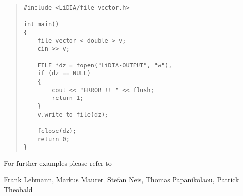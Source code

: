 
\EXAMPLES

\begin{quote}
\begin{verbatim}
#include <LiDIA/file_vector.h>

int main()
{
    file_vector < double > v;
    cin >> v;

    FILE *dz = fopen("LiDIA-OUTPUT", "w");
    if (dz == NULL)
    {
        cout << "ERROR !! " << flush;
        return 1;
    }
    v.write_to_file(dz);

    fclose(dz);
    return 0;
}
\end{verbatim}
\end{quote}

For further examples please refer to 



\AUTHOR

Frank Lehmann, Markus Maurer, Stefan Neis, Thomas Papanikolaou, Patrick
Theobald
